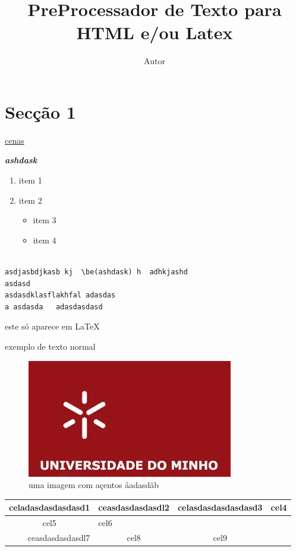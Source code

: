\documentclass[10pt]{article}
\title{PreProcessador de Texto para HTML e/ou Latex}
\author{Autor}
\begin{document}
\maketitle
\tableofcontents



\section{Secção 1}

\href{http://www.google.pt}{cenas}

\textbf{\emph{ashdask}}

\begin{enumerate}
\item item 1
\item item 2
\begin{itemize}
\item item 3 
\item item 4
\end{itemize}
\end{enumerate}

\begin{verbatim}

asdjasbdjkasb kj  \be(ashdask) h  adhkjashd    
asdasd
asdasdklasflakhfal adasdas 
a asdasda   adasdasdasd
\end{verbatim}

este só aparece em \LaTeX
 
exemplo de texto normal
\begin{figure}[!hbp]
\includegraphics[scale=1.50]{uminho.jpg}
\caption{uma imagem com açentos âadasdãb}
\end{figure}


\begin{tabular}{|l|l|l|l|}
\hline
\multicolumn{1}{|c|}{celadasdasdasdasd1} & \multicolumn{1}{|r|}{ceasdasdasdasdl2} & \multicolumn{1}{|l|}{celasdasdasdasdasd3} & \multicolumn{1}{|l|}{cel4}\\
\hline
\multicolumn{1}{|c|}{cel5} & \multicolumn{1}{|l|}{cel6} &  & \\
\hline
\multicolumn{1}{|r|}{ceasdasdasdasdl7} & \multicolumn{1}{|c|}{cel8 } & \multicolumn{1}{|c|}{cel9} & \\
\hline
\end{tabular}
\end{document}
